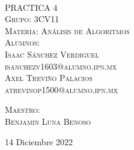 \begin{titlepage}
\begin{minipage}[c][0.81\textheight][t]{0.25\textwidth}
\begin{center}
    \end{center}
  \end{minipage}
  \begin{minipage}[c][0.81\textheight][t]{0.75\textwidth}
    \begin{center}
      \vspace{1cm}

      {\color{black}{\large\scshape Semestre 2023-1}}\\[.2in]

      \vspace{0.5cm}            

      \textsc{\LARGE PRACTICA 4}\\[1.5cm]
      \textsc{\large Grupo: 3CV11}\\[0.5cm]
      \textsc{\large Materia: Análisis de Algoritmos}\\[0.5cm]
      
      {\color{black}\textsc{\large Alumnos:}}\\[0.5cm]
      \textsc{\large {Isaac Sánchez Verdiguel}}\\[1cm]
      \textsc{ {isanchezv1603@alumno.ipn.mx}}\\[1cm]   
      \textsc{\large {Axel Treviño Palacios}}\\[1cm]
      \textsc{ {atrevinop1500@alumno.ipn.mx}}\\[1cm]   
      
      
      
      \vspace{0.5cm}

      {\large\scshape 
        {\color{black}Maestro:}\\[0.3cm] {Benjamin Luna Benoso}}\\[.2in]

      \vspace{0.5cm}
       
      \large{14 Diciembre 2022}
    \end{center}
  \end{minipage}
\end{titlepage}
